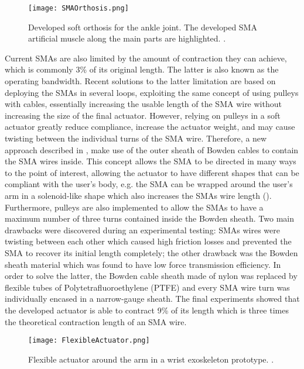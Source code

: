 \begin{figure}[hbtp!]
    \centering
    \texttt{[image: SMAOrthosis.png]}
    \caption{Developed soft orthosis for the ankle joint. The developed SMA artificial muscle along the main parts are highlighted. \cite{Zhang2013a}. }
    \label{fig:SMA_orthosis}
\end{figure}

Current SMAs are also limited by the amount of contraction they can achieve, which is commonly 3\% of its original length. The latter is also known as the operating bandwidth. Recent solutions to the latter limitation are based on deploying the SMAs in several loops, exploiting the same concept of using pulleys with cables, essentially increasing the usable length of the SMA wire without increasing the size of the final actuator. However, relying on pulleys in a soft actuator greatly reduce compliance, increase the actuator weight, and may cause twisting between the individual turns of the SMA wire. Therefore, a new approach described in \cite{Villoslada2015}, make use of the outer sheath of Bowden cables to contain the SMA wires inside. This concept allows the SMA to be directed in many ways to the point of interest, allowing the actuator to have different shapes that can be compliant with the user's body, e.g. the SMA can be wrapped around the user's arm in a solenoid-like shape which also increases the SMAs wire length (). Furthermore, pulleys are also implemented to allow the SMAs to have a maximum number of three turns contained inside the Bowden sheath. Two main drawbacks were discovered during an experimental testing: SMAs wires were twisting between each other which caused high friction losses and prevented the SMA to recover its initial length completely; the other drawback was the Bowden sheath material which was found to have low force transmission efficiency. In order to solve the latter, the Bowden cable sheath made of nylon was replaced by flexible tubes of Polytetrafluoroethylene (PTFE) and every SMA wire turn was individually encased in a narrow-gauge sheath. The final experiments showed that the developed actuator is able to contract 9\% of its length which is three times the theoretical contraction length of an SMA wire.

\begin{figure}[hbtp!]
    \centering
    \texttt{[image: FlexibleActuator.png]}
    \caption{Flexible actuator around the arm in a wrist exoskeleton prototype. \cite{Villoslada2015}. }
    \label{fig:flexible_actuator}
\end{figure}

